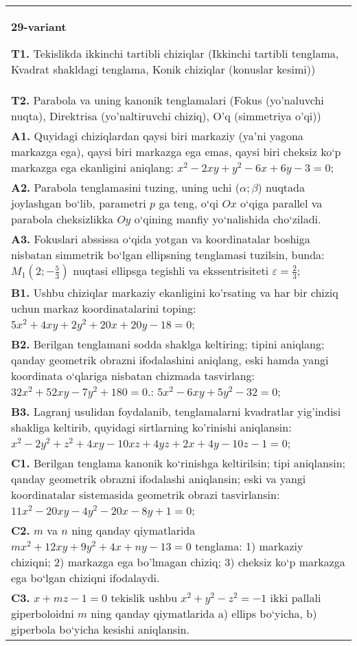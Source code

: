 \documentclass{article}
\begin{document}
\begin{tabular}{m{17cm}}
\textbf{29-variant}
\newline

\textbf{T1.} Tekislikda ikkinchi tartibli chiziqlar (Ikkinchi tartibli tenglama, Kvadrat shakldagi tenglama, Konik chiziqlar (konuslar kesimi)) \\
\textbf{T2.} Parabola va uning kanonik tenglamalari (Fokus (yo’naluvchi nuqta), Direktrisa (yo’naltiruvchi chiziq), O’q (simmetriya o’qi)) \\
\textbf{A1.} Quyidagi chiziqlardan qaysi biri markaziy (ya’ni yagona markazga ega), qaysi biri markazga ega emas, qaysi biri cheksiz ko‘p markazga ega ekanligini aniqlang: $x^2-2 x y+y^2-6 x+6 y-3=0$; \\
\textbf{A2.} Parabola tenglamasini tuzing, uning uchi ($\alpha; \beta$) nuqtada joylashgan bo‘lib, parametri $p$ ga teng, o‘qi $Ox$ o‘qiga parallel va parabola cheksizlikka $Oy$ o‘qining manfiy yo‘nalishida cho‘ziladi. \\
\textbf{A3.} Fokuslari abssissa o‘qida yotgan va koordinatalar boshiga nisbatan simmetrik bo‘lgan ellipsning tenglamasi tuzilsin, bunda: $M_1\left(2 ;-\frac{5}{3}\right)$ nuqtasi ellipsga tegishli va ekssentrisiteti $\varepsilon=\frac{2}{3}$; \\
\textbf{B1.} Ushbu chiziqlar markaziy ekanligini ko'rsating va har bir chiziq uchun markaz koordinatalarini toping: $5 x^2+4 x y+2 y^2+20 x+20 y-18=0$; \\
\textbf{B2.} Berilgan tenglamani sodda shaklga keltiring; tipini aniqlang; qanday geometrik obrazni ifodalashini aniqlang, eski hamda yangi koordinata o‘qlariga nisbatan chizmada tasvirlang: $32x^2+52xy-7y^2+180=0$.: $5 x^2-6 x y+5 y^2-32=0$; \\
\textbf{B3.} Lagranj usulidan foydalanib, tenglamalarni kvadratlar yig'indisi shakliga keltirib, quyidagi sirtlarning ko'rinishi aniqlansin: $x^2-2 y^2+z^2+4 x y-10 x z+4 y z+2 x+4 y-10 z-1=0$; \\
\textbf{C1.} Berilgan tenglama kanonik ko‘rinishga keltirilsin; tipi aniqlansin; qanday geometrik obrazni ifodalashi aniqlansin; eski va yangi koordinatalar sistemasida geometrik obrazi tasvirlansin: $11 x^2-20 x y-4 y^2-20 x-8 y+1=0$; \\
\textbf{C2.} $m$ va $n$ ning qanday qiymatlarida $m x^2+12 x y+9 y^2+4 x+n y-13=0$ tenglama: 1) markaziy chiziqni; 2) markazga ega bo'lmagan chiziq; 3) cheksiz ko‘p markazga ega bo‘lgan chiziqni ifodalaydi. \\
\textbf{C3.} $x+m z-1=0$ tekislik ushbu $x^2+y^2-z^2=-1$ ikki pallali giperboloidni $m$ ning qanday qiymatlarida a) ellips bo‘yicha, b) giperbola bo‘yicha kesishi aniqlansin. \\

\end{tabular}
\vspace{1cm}
\end{document}

